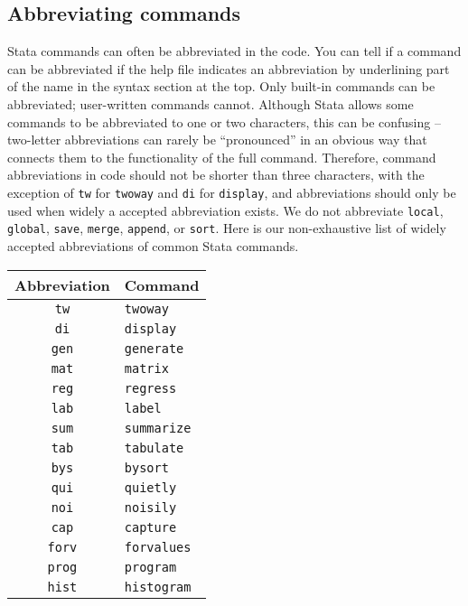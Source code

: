 \subsection{Abbreviating commands}

Stata commands can often be abbreviated in the code.
You can tell if a command can be abbreviated if the help file indicates an abbreviation by underlining part of the name in the syntax section at the top.
Only built-in commands can be abbreviated; user-written commands cannot.
Although Stata allows some commands to be abbreviated to one or two characters,
this can be confusing -- two-letter abbreviations can rarely be ``pronounced''
in an obvious way that connects them to the functionality of the full command.
Therefore, command abbreviations in code should not be shorter than three characters,
with the exception of \texttt{tw} for \texttt{twoway} and \texttt{di} for \texttt{display},
and abbreviations should only be used when widely a accepted abbreviation exists.
We do not abbreviate \texttt{local}, \texttt{global}, \texttt{save}, \texttt{merge}, \texttt{append}, or \texttt{sort}.
Here is our non-exhaustive list of widely accepted abbreviations of common Stata commands.

\begin{center}
	\begin{tabular}{ c | l }
    Abbreviation & Command \\
		\hline
		\texttt{tw} & \texttt{twoway} \\
		\texttt{di} & \texttt{display} \\
		\texttt{gen} & \texttt{generate} \\
		\texttt{mat} & \texttt{matrix} \\
		\texttt{reg} & \texttt{regress} \\
		\texttt{lab} & \texttt{label} \\
		\texttt{sum} & \texttt{summarize} \\
		\texttt{tab} & \texttt{tabulate} \\
		\texttt{bys} & \texttt{bysort} \\
		\texttt{qui} & \texttt{quietly} \\
		\texttt{noi} & \texttt{noisily} \\
		\texttt{cap} & \texttt{capture} \\
		\texttt{forv} & \texttt{forvalues} \\
		\texttt{prog} & \texttt{program} \\
		\texttt{hist} & \texttt{histogram} \\
		\hline
	\end{tabular}
\end{center}

